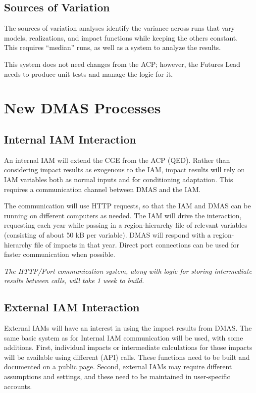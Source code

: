 \documentclass[12pt, oneside]{amsart}
\begin{document}
\subsection{Sources of Variation}
\label{sec:variations}

The sources of variation analyses identify the variance across runs
that vary models, realizations, and impact functions while keeping the
others constant.  This requires ``median'' runs, as well as a system
to analyze the results.

This system does not need changes from the ACP; however, the Futures
Lead needs to produce unit tests and manage the logic for it.

\section{New DMAS Processes}

\subsection{Internal IAM Interaction}
\label{sec:internaliam}

An internal IAM will extend the CGE from the ACP (QED).  Rather than
considering impact results as exogenous to the IAM, impact results
will rely on IAM variables both as normal inputs and for conditioning
adaptation.  This requires a communication channel between DMAS and
the IAM.

The communication will use HTTP requests, so that the IAM and DMAS can
be running on different computers as needed.  The IAM will drive the
interaction, requesting each year while passing in a region-hierarchy
file of relevant variables (consisting of about 50 kB per variable).
DMAS will respond with a region-hierarchy file of impacts in that
year.  Direct port connections can be used for faster communication
when possible.

{\it The HTTP/Port communication system, along with logic for storing
  intermediate results between calls, will take 1 week to build.}

\subsection{External IAM Interaction}
\label{sec:externaliam}

External IAMs will have an interest in using the impact results from
DMAS.  The same basic system as for Internal IAM communication will be
used, with some additions.  First, individual impacts or intermediate
calculations for those impacts will be available using different (API)
calls.  These functions need to be built and documented on a public
page.  Second, external IAMs may require different assumptions and
settings, and these need to be maintained in user-specific accounts.
\end{document}
